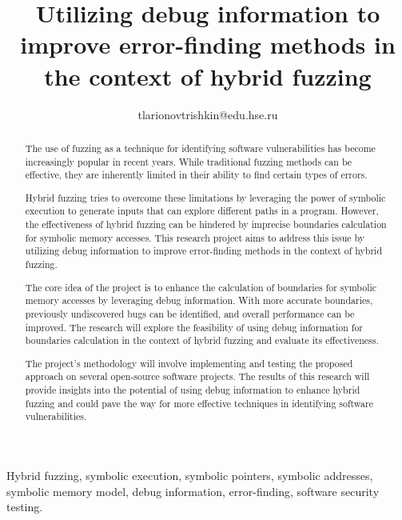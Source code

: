 \documentclass[conference]{IEEEtran}
\begin{document}
\title{Utilizing debug information to improve error-finding methods in the context of hybrid fuzzing}

\author{
    tlarionovtrishkin@edu.hse.ru
}

\maketitle

\begin{abstract}
    The use of fuzzing as a technique for identifying software vulnerabilities has become increasingly popular in recent years. While traditional fuzzing methods can be effective, they are inherently limited in their ability to find certain types of errors.

    Hybrid fuzzing tries to overcome these limitations by leveraging the power of symbolic execution to generate inputs that can explore different paths in a program. However, the effectiveness of hybrid fuzzing can be hindered by imprecise boundaries calculation for symbolic memory accesses. This research project aims to address this issue by utilizing debug information to improve error-finding methods in the context of hybrid fuzzing.

    The core idea of the project is to enhance the calculation of boundaries for symbolic memory accesses by leveraging debug information. With more accurate boundaries, previously undiscovered bugs can be identified, and overall performance can be improved. The research will explore the feasibility of using debug information for boundaries calculation in the context of hybrid fuzzing and evaluate its effectiveness.

    The project's methodology will involve implementing and testing the proposed approach on several open-source software projects. The results of this research will provide insights into the potential of using debug information to enhance hybrid fuzzing and could pave the way for more effective techniques in identifying software vulnerabilities.
\end{abstract}

\IEEEoverridecommandlockouts
\begin{IEEEkeywords}
    Hybrid fuzzing, symbolic execution, symbolic pointers, symbolic addresses, symbolic memory model, debug information, error-finding, software security testing.
\end{IEEEkeywords}
\end{document}
